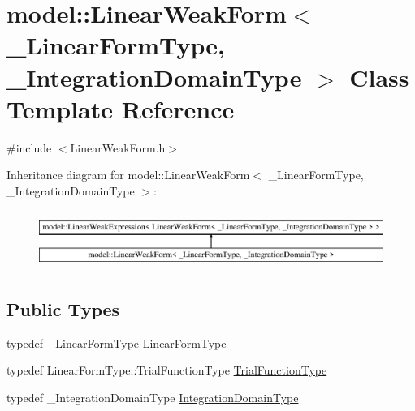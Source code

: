 \hypertarget{classmodel_1_1_linear_weak_form}{}\section{model\+:\+:Linear\+Weak\+Form$<$ \+\_\+\+Linear\+Form\+Type, \+\_\+\+Integration\+Domain\+Type $>$ Class Template Reference}
\label{classmodel_1_1_linear_weak_form}


{\ttfamily \#include $<$Linear\+Weak\+Form.\+h$>$}

Inheritance diagram for model\+:\+:Linear\+Weak\+Form$<$ \+\_\+\+Linear\+Form\+Type, \+\_\+\+Integration\+Domain\+Type $>$\+:\begin{figure}[H]
\begin{center}
\leavevmode
\includegraphics[height=1.941074cm]{classmodel_1_1_linear_weak_form}
\end{center}
\end{figure}
\subsection*{Public Types}
\begin{DoxyCompactItemize}
\item 
typedef \+\_\+\+Linear\+Form\+Type \hyperlink{classmodel_1_1_linear_weak_form_a615022ae48cb4a4bdb80eaa954bf5e1e}{Linear\+Form\+Type}
\item 
typedef Linear\+Form\+Type\+::\+Trial\+Function\+Type \hyperlink{classmodel_1_1_linear_weak_form_a46fe3aab1c9664bb7a49d41b08e995ec}{Trial\+Function\+Type}
\item 
typedef \+\_\+\+Integration\+Domain\+Type \hyperlink{classmodel_1_1_linear_weak_form_a5a2c3fddd71479eb47af0c4ec7657b0a}{Integration\+Domain\+Type}
\end{DoxyCompactItemize}
